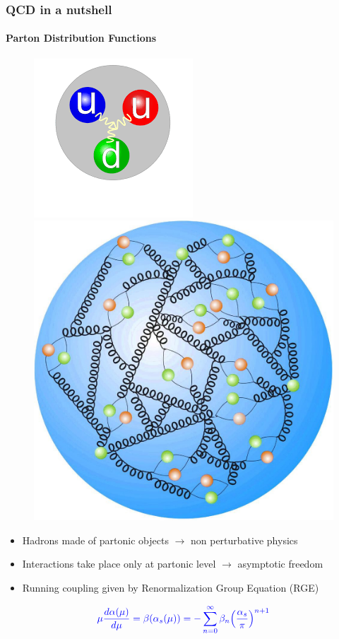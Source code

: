\documentclass[aspectratio=43]{beamer}
\begin{document}
\begin{frame}

	\frametitle{QCD in a nutshell}
	\framesubtitle{Parton Distribution Functions}
	
	\begin{figure}
		\includegraphics[width = 0.5\linewidth]{plots/proton.png}
		\endminipage\hfill
		\includegraphics[width = 0.4\linewidth]{plots/proton2.jpg}
		\endminipage
	\end{figure}
	

	\begin{itemize}
		\item Hadrons made of partonic objects $\longrightarrow$ non perturbative physics
		\item Interactions take place only at partonic level $\longrightarrow$ asymptotic freedom
		\item Running coupling given by Renormalization Group Equation (RGE)
	\end{itemize}

	\begin{equation}
		{\color{blue}\mu\frac{d\alpha(\mu)}{d\mu} = \beta(\alpha_{s}(\mu)) = -\sum_{n = 0}^{\infty} \beta_{n} \Big( \frac{\alpha_{s}}{\pi} \Big)^{n + 1}} \nonumber
	\end{equation}

\end{frame}
\end{document}
